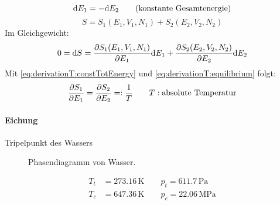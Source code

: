 \begin{equation}
    \label{eq:derivationT:constTotEnergy}
    \mathrm{d} E_1 = - \mathrm{d} E_2 \qquad \text{(konstante Gesamtenergie)}
\end{equation}
\begin{equation}
    S = S_1(E_1, V_1, N_1) + S_2 (E_2, V_2, N_2)
\end{equation}
Im Gleichgewicht:
\begin{equation}
    \label{eq:derivationT:equilibrium}
    0 = \mathrm{d} S = \frac{\partial S_1(E_1, V_1, N_1)}{\partial E_1} \mathrm{d} E_1 + \frac{\partial S_2 (E_2, V_2, N_2)}{\partial E_2} \mathrm{d} E_2
\end{equation}
Mit \autoref{eq:derivationT:constTotEnergy} und \autoref{eq:derivationT:equilibrium} folgt:
\begin{equation}
    \frac{\partial S_1}{\partial E_1} = \frac{\partial S_2}{\partial E_2} =: \frac{1}{T} \qquad T:\text{absolute Temperatur}
\end{equation}

\paragraph{Eichung} Tripelpunkt des Wassers

  \begin{figure}[H]
        \centering
        \def\svgwidth{0.5\textwidth}
        
        \caption{Phasendiagramm von Wasser.}
        \label{img:tripelpoint}
    \end{figure}

\begin{equation}
    \begin{split}
        T_t &= 273.16 \, \text{K} \qquad p_t = 611.7 \, \text{Pa} \\
        T_c &= 647.36 \, \text{K} \qquad p_c = 22.06 \, \text{MPa}
    \end{split}
\end{equation}

